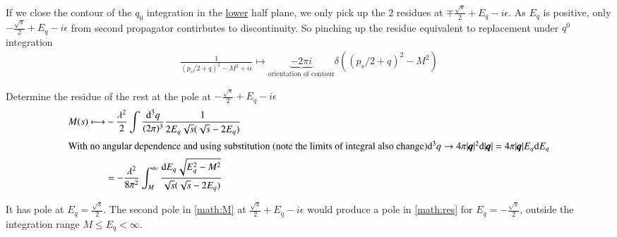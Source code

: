 \begin{center}
\end{center}

If we close the contour of the $q_0$ integration in the \underline{lower} half plane, we only pick up the 2 residues at $\mp \frac{\sqrt{s}}{2}+E_q -i\epsilon$. As $E_q$ is positive, only $-\frac{\sqrt{s}}{2} + E_q -i \epsilon$ from second propagator contirbutes to discontinuity. So pinching up the residue equivalent to replacement under $q^0$ integration
\begin{align*}
	\frac{1}{(p_s /2 + q)^2 - M^2 +i\epsilon} \longmapsto  \underbrace{-2\pi i}_{\text{orientation of contour}} \delta((p_s / 2 + q)^2 - M^2)
\end{align*}

Determine the residue of the rest at the pole at $-\frac{\sqrt{s}}{2} + E_q  - i\epsilon$
\begin{align}
	M(s) \longmapsto &-\frac{\lambda^2}{2} \int \frac{\dd^3 q}{(2\pi)^3} \frac{1}{2E_q \sqrt{s}(\sqrt{s}-2E_q)} \notag \\
	\shortintertext{With no angular dependence and using substitution (note the limits of integral also change)$\dd^3 q \rightarrow 4 \pi |\pmb{q}|^2 \dd |\pmb{q}| = 4 \pi |\pmb{q}|E_q \dd E_q$}
	& = -\frac{\lambda^2}{8\pi^2} \int^\infty_M \frac{\dd E_q \sqrt{E_q^2 - M^2}}{\sqrt{s}(\sqrt{s} - 2E_q)}  \label{math:res}
\end{align}

It has pole at $E_q = \frac{\sqrt{s}}{2}$. The second pole in \ref{math:M} at $\frac{\sqrt{s}}{2} + E_q - i\epsilon$ would produce a pole in \ref{math:res} for $E_q = -\frac{\sqrt{s}}{2}$, outside the integration range $M \leq E_q < \infty$.

